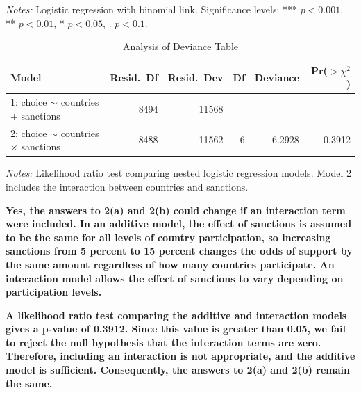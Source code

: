 \documentclass[12pt,letterpaper]{article}
\begin{document}
\begin{enumerate}
\begin{itemize}
\begin{table}[htbp]
				\vspace{0.5em}
				\begin{minipage}{0.9\linewidth}
					\footnotesize
					\textit{Notes:} Logistic regression with binomial link. 
					Significance levels: *** $p<0.001$, ** $p<0.01$, * $p<0.05$, . $p<0.1$.
				\end{minipage}
			\end{table}
			
			\begin{table}[htbp]
				\centering
				\caption{Analysis of Deviance Table}
				\begin{tabular}{lrrrrr}
					\toprule
					Model & Resid.\ Df & Resid.\ Dev & Df & Deviance & Pr($>\chi^2$) \\
					\midrule
					1: choice $\sim$ countries + sanctions 
					& 8494 & 11568 &  &  &  \\
					
					2: choice $\sim$ countries $\times$ sanctions 
					& 8488 & 11562 & 6 & 6.2928 & 0.3912 \\
					\bottomrule
				\end{tabular}
				
				\vspace{0.5cm}
				\begin{minipage}{0.9\linewidth}
					\footnotesize
					\textit{Notes:} Likelihood ratio test comparing nested logistic regression models.
					Model 2 includes the interaction between countries and sanctions.
				\end{minipage}
			\end{table}
			
			\textbf{Yes, the answers to 2(a) and 2(b) could change if an interaction term were included. In an additive model, the effect of sanctions is assumed to be the same for all levels of country participation, so increasing sanctions from 5 percent to 15 percent changes the odds of support by the same amount regardless of how many countries participate. An interaction model allows the effect of sanctions to vary depending on participation levels.}
			
			\textbf{A likelihood ratio test comparing the additive and interaction models gives a p-value of 0.3912. Since this value is greater than 0.05, we fail to reject the null hypothesis that the interaction terms are zero. Therefore, including an interaction is not appropriate, and the additive model is sufficient. Consequently, the answers to 2(a) and 2(b) remain the same.}
			
	\end{itemize}
	\end{enumerate}
\end{document}
